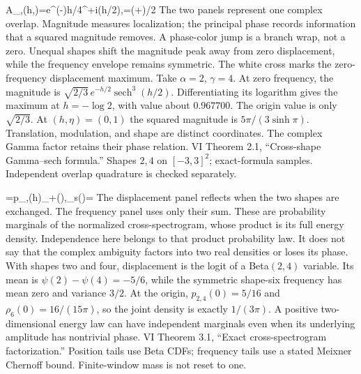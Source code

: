 {\mathcal A_{\alpha,\gamma}(h,\eta)=e^{(\alpha-\gamma)h/4}^{\lambda+i\eta}(h/2),\quad\lambda=(\alpha+\gamma)/2}
{The two panels represent one complex overlap. Magnitude measures localization; the principal phase records information that a squared magnitude removes. A phase-color jump is a branch wrap, not a zero. Unequal shapes shift the magnitude peak away from zero displacement, while the frequency envelope remains symmetric. The white cross marks the zero-frequency displacement maximum.}
{Take $\alpha=2$, $\gamma=4$. At zero frequency, the magnitude is $\sqrt{2/3}\,e^{-h/2}\operatorname{sech}^3(h/2)$. Differentiating its logarithm gives the maximum at $h=-\log2$, with value about $0.967700$. The origin value is only $\sqrt{2/3}$. At $(h,\eta)=(0,1)$ the squared magnitude is $5\pi/(3\sinh\pi)$.}
{Translation, modulation, and shape are distinct coordinates. The complex Gamma factor retains their phase relation.}
{VI Theorem 2.1, ``Cross-shape Gamma--sech formula.'' Shapes $2,4$ on $[-3,3]^2$; exact-formula samples. Independent overlap quadrature is checked separately.}

{=p_{\alpha,\gamma}(h)\rho_{\alpha+\gamma}(\eta),\qquad \rho_s(\eta)=}
{The displacement panel reflects when the two shapes are exchanged. The frequency panel uses only their sum. These are probability marginals of the normalized cross-spectrogram, whose product is its full energy density. Independence here belongs to that product probability law. It does not say that the complex ambiguity factors into two real densities or loses its phase.}
{With shapes two and four, displacement is the logit of a Beta$(2,4)$ variable. Its mean is $\psi(2)-\psi(4)=-5/6$, while the symmetric shape-six frequency has mean zero and variance $3/2$. At the origin, $p_{2,4}(0)=5/16$ and $\rho_6(0)=16/(15\pi)$, so the joint density is exactly $1/(3\pi)$.}
{A positive two-dimensional energy law can have independent marginals even when its underlying amplitude has nontrivial phase.}
{VI Theorem 3.1, ``Exact cross-spectrogram factorization.'' Position tails use Beta CDFs; frequency tails use a stated Meixner Chernoff bound. Finite-window mass is not reset to one.}

